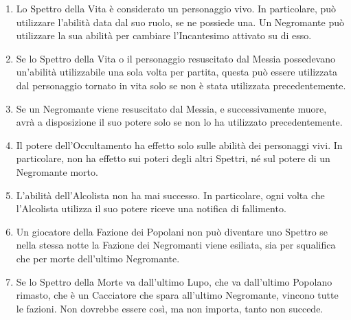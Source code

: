 \documentclass[a4paper,10pt]{article}
\begin{document}
\begin{enumerate}
	\item Lo Spettro della Vita è considerato un personaggio vivo. In particolare, può utilizzare l'abilità data dal suo ruolo, se ne possiede una. Un Negromante può utilizzare la sua abilità per cambiare l'Incantesimo attivato su di esso.
	
	\item Se lo Spettro della Vita o il personaggio resuscitato dal Messia possedevano un'abilità utilizzabile una sola volta per partita, questa può essere utilizzata dal personaggio tornato in vita solo se non è stata utilizzata precedentemente.
	
	\item Se un Negromante viene resuscitato dal Messia, e successivamente muore, avrà a disposizione il suo potere solo se non lo ha utilizzato precedentemente.
	
	\item Il potere dell'Occultamento ha effetto solo sulle abilità dei personaggi vivi. In particolare, non ha effetto sui poteri degli altri Spettri, né sul potere di un Negromante morto.
	
	\item L'abilità dell'Alcolista non ha mai successo. In particolare, ogni volta che l'Alcolista utilizza il suo potere riceve una notifica di fallimento.
	
	\item Un giocatore della Fazione dei Popolani non può diventare uno Spettro se nella stessa notte la Fazione dei Negromanti viene esiliata, sia per squalifica che per morte dell'ultimo Negromante.
	
	\item Se lo Spettro della Morte va dall'ultimo Lupo, che va dall'ultimo Popolano rimasto, che è un Cacciatore che spara all'ultimo Negromante, vincono tutte le fazioni. Non dovrebbe essere così, ma non importa, tanto non succede.
	
	
	

\end{enumerate}
\end{document}
